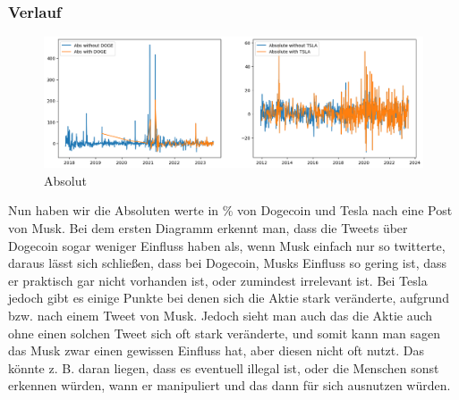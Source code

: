 \documentclass{article}
\begin{document}
\subsubsection{Verlauf}
\begin{figure}[!htb]
  	\includegraphics[width=\textwidth, center]{../imgs/Absolut.png}
 	\caption{Absolut}
 	\label{fig:Absolut}
\end{figure}
Nun haben wir die Absoluten werte in \% von Dogecoin und Tesla nach eine Post von Musk. Bei dem ersten Diagramm erkennt man, dass die Tweets über Dogecoin sogar weniger Einfluss haben als, wenn Musk einfach nur so twitterte, daraus lässt sich schließen, dass bei Dogecoin, Musks Einfluss so gering ist, dass er praktisch gar nicht vorhanden ist, oder zumindest irrelevant ist. Bei Tesla jedoch gibt es einige Punkte bei denen sich die Aktie stark veränderte, aufgrund bzw. nach einem Tweet von Musk. Jedoch sieht man auch das die Aktie auch ohne einen solchen Tweet sich oft stark veränderte, und somit kann man sagen das Musk zwar einen gewissen Einfluss hat, aber diesen nicht oft nutzt. Das könnte z. B. daran liegen, dass es eventuell illegal ist, oder die Menschen sonst erkennen würden, wann er manipuliert und das dann für sich ausnutzen würden.
\end{document}
